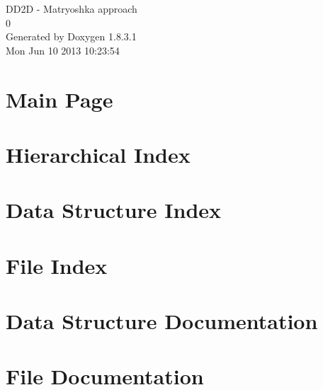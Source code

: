 \documentclass{book}
\begin{document}
\hypersetup{pageanchor=false,citecolor=blue}
\begin{titlepage}
\vspace*{7cm}
\begin{center}
{\Large D\-D2\-D -\/ Matryoshka approach \\[1ex]\large 0 }\\
\vspace*{1cm}
{\large Generated by Doxygen 1.8.3.1}\\
\vspace*{0.5cm}
{\small Mon Jun 10 2013 10:23:54}\\
\end{center}
\end{titlepage}
\clearemptydoublepage
{}
\tableofcontents
\clearemptydoublepage
{}
\hypersetup{pageanchor=true,citecolor=blue}
\chapter{Main Page}
\label{index}\hypertarget{index}{}
\chapter{Hierarchical Index}

\chapter{Data Structure Index}

\chapter{File Index}

\chapter{Data Structure Documentation}










\chapter{File Documentation}




























\printindex
\end{document}
